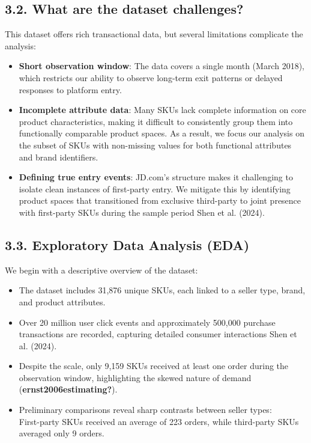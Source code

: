 \documentclass[
  letterpaper,
  DIV=11,
  numbers=noendperiod]{scrartcl}
\providecommand{\tightlist}{%
  \setlength{\itemsep}{0pt}\setlength{\parskip}{0pt}}\usepackage{longtable,booktabs,array}
\begin{document}
\subsection{3.2. What are the dataset
challenges?}\label{what-are-the-dataset-challenges}

This dataset offers rich transactional data, but several limitations
complicate the analysis:

\begin{itemize}
\tightlist
\item
  \textbf{Short observation window}: The data covers a single month
  (March 2018), which restricts our ability to observe long-term exit
  patterns or delayed responses to platform entry.
\item
  \textbf{Incomplete attribute data}: Many SKUs lack complete
  information on core product characteristics, making it difficult to
  consistently group them into functionally comparable product spaces.
  As a result, we focus our analysis on the subset of SKUs with
  non-missing values for both functional attributes and brand
  identifiers.
\item
  \textbf{Defining true entry events}: JD.com's structure makes it
  challenging to isolate clean instances of first-party entry. We
  mitigate this by identifying product spaces that transitioned from
  exclusive third-party to joint presence with first-party SKUs during
  the sample period Shen et al. (2024).
\end{itemize}

\subsection{3.3. Exploratory Data Analysis
(EDA)}\label{exploratory-data-analysis-eda}

We begin with a descriptive overview of the dataset:

\begin{itemize}
\tightlist
\item
  The dataset includes 31,876 unique SKUs, each linked to a seller type,
  brand, and product attributes.
\item
  Over 20 million user click events and approximately 500,000 purchase
  transactions are recorded, capturing detailed consumer interactions
  Shen et al. (2024).
\item
  Despite the scale, only 9,159 SKUs received at least one order during
  the observation window, highlighting the skewed nature of demand
  (\textbf{ernst2006estimating?}).
\item
  Preliminary comparisons reveal sharp contrasts between seller types:\\
  First-party SKUs received an average of 223 orders, while third-party
  SKUs averaged only 9 orders.
\end{itemize}
\end{document}
